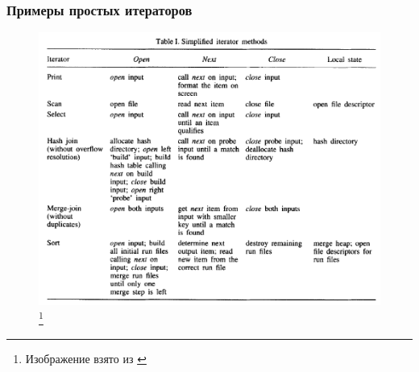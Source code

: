 \documentclass{beamer}
\begin{document}
\begin{frame}
\frametitle{Примеры простых итераторов}

\begin{figure}[htb]
\includegraphics[width=\textwidth,height=0.8\textheight,keepaspectratio]{iterators.png} 
\footnote{\tiny{Изображение взято из \cite{Graefe1996}}}
\end{figure}

\end{frame}

\end{document}
